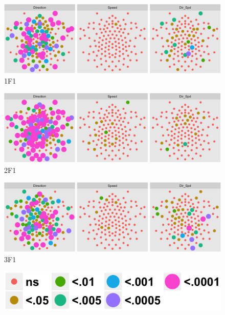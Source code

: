 \documentclass[landscape,final,paperwidth=72in,paperheight=42in,fontscale=0.285]{baposter}
\begin{document}
\begin{poster}
{\begin{demobox}[title=Direction-Speed Interaction]
\begin{figure}[H]
  \centering
  \caption{1F1}\label{1F1-analyze-and-plot-main-effects-1.png}
  \includegraphics[scale=0.3]{../../figs/1F1-analyze-and-plot-main-effects-1.png}
\end{figure}

\begin{figure}[H]
  \centering
  \caption{2F1}\label{2F1-analyze-and-plot-main-effects-1.png}
  \includegraphics[scale=0.3]{../../figs/2F1-analyze-and-plot-main-effects-1.png}
\end{figure}

\begin{figure}[H]
  \centering
    \caption{3F1}\label{3F1-analyze-and-plot-main-effects-1.png}
    \includegraphics[scale=0.3]{../../figs/3F1-analyze-and-plot-main-effects-1.png}
\end{figure}

\begin{figure}[H]
  \centering
  \includegraphics[scale=0.3]{../../figs/legend-analyze-and-plot-main-effects-1.png}
\end{figure}


\end{demobox}}
\end{poster}
\end{document}
